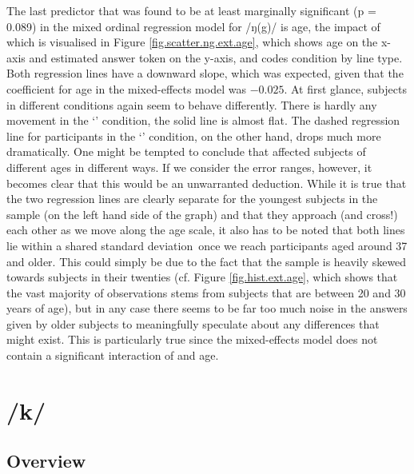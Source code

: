 The last predictor that was found to be at least marginally significant (p = 0.089) in the mixed ordinal regression model for /ŋ(g)/ is age, the impact of which is visualised in Figure \ref{fig.scatter.ng.ext.age}, which shows age on the x-axis and estimated answer token on the y-axis, and codes  condition by line type.
Both regression lines have a downward slope, which was expected, given that the coefficient for age in the mixed-effects model was \ensuremath{-0.025}.
At first glance, subjects in different  conditions again seem to behave differently.
There is hardly any movement in the `' condition, the solid line is almost flat.
The dashed regression line for participants in the `' condition, on the other hand, drops much more dramatically.
One might be tempted to conclude that  affected subjects of different ages in different ways.
If we consider the error ranges, however, it becomes clear that this would be an unwarranted deduction.
While it is true that the two regression lines are clearly separate for the youngest subjects in the sample (on the left hand side of the graph) and that they approach (and cross!) each other as we move along the age scale, it also has to be noted that both lines lie within a shared standard deviation\ once we reach participants aged around 37 and older.
This could simply be due to the fact that the sample is heavily skewed towards subjects in their twenties (cf. Figure \ref{fig.hist.ext.age}, which shows that the vast majority of observations stems from subjects that are between 20 and 30 years of age), but in any case there seems to be far too much noise in the answers given by older subjects to meaningfully speculate about any differences that might exist.
This is particularly true since the mixed-effects model does not contain a significant interaction of  and age.

\section{/k/}
\label{sec.perc_res.k}
	\subsection{Overview}
	\label{sec.perc_res.k.overview}

